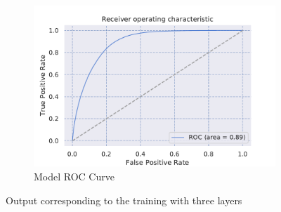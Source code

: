 \begin{figure}[H]
\begin{subfigure}[b]{0.3\textwidth}
         \centering
         \includegraphics[width=\textwidth]{figure_3/three_layer_only_ROC.pdf}
         \caption{Model ROC Curve}
         \label{fig:five over x}
     \end{subfigure}
        \caption{Output corresponding to the training with three layers}
        \label{fig:three graphs}
\end{figure}




